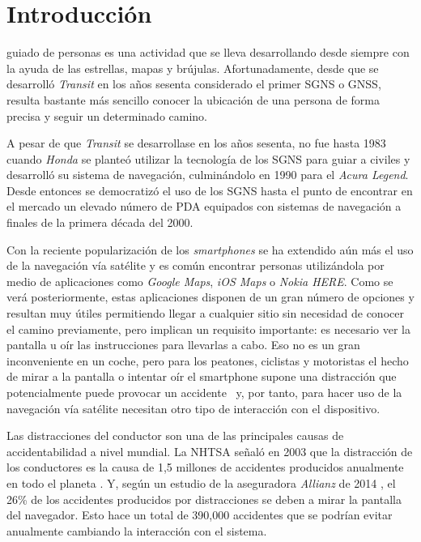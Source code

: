 \chapter{Introducción}
\label{chap:intro}

 guiado de personas es una actividad que se lleva desarrollando desde siempre con la
ayuda de las estrellas, mapas y brújulas. Afortunadamente, desde que se desarrolló \emph{Transit} en
los años sesenta considerado el primer \acf{SGNS} o \acf{GNSS}, resulta bastante más sencillo
conocer la ubicación de una persona de forma precisa y seguir un determinado camino.

A pesar de que \emph{Transit} se desarrollase en los años sesenta, no fue hasta 1983 cuando
\emph{Honda} se planteó utilizar la tecnología de los \acs{SGNS} para guiar a civiles y desarrolló
su sistema de navegación, culminándolo en 1990 para el \emph{Acura Legend}. Desde entonces se
democratizó el uso de los \acs{SGNS} hasta el punto de encontrar en el mercado un elevado número de
\acf{PDA} equipados con sistemas de navegación a finales de la primera década del 2000.

Con la reciente popularización de los \emph{smartphones} se ha extendido aún más el uso de la
navegación vía satélite y es común encontrar personas utilizándola por medio de aplicaciones como
\emph{Google Maps}, \emph{iOS Maps} o \emph{Nokia HERE}. Como se verá posteriormente, estas
aplicaciones disponen de un gran número de opciones y resultan muy útiles permitiendo llegar
a cualquier sitio sin necesidad de conocer el camino previamente, pero implican un requisito
importante: es necesario ver la pantalla u oír las instrucciones para llevarlas a cabo. Eso no es un
gran inconveniente en un coche, pero para los peatones, ciclistas y motoristas el hecho de mirar a
la pantalla o intentar oír el smartphone supone una distracción que potencialmente puede provocar un
accidente~\cite{Valcarcel12} y, por tanto, para hacer uso de la navegación vía satélite necesitan
otro tipo de interacción con el dispositivo.

Las distracciones del conductor son una de las principales causas de accidentabilidad a nivel
mundial. La \acf{NHTSA} señaló en 2003 que la distracción de los conductores es la causa de 1,5
millones de accidentes producidos anualmente en todo el planeta \cite{RACC03}. Y, según un estudio
de la aseguradora \emph{Allianz} de 2014 \cite{Allianz14}, el 26\% de los accidentes producidos por
distracciones se deben a mirar la pantalla del navegador. Esto hace un total de 390,000 accidentes
que se podrían evitar anualmente cambiando la interacción con el sistema.\\

